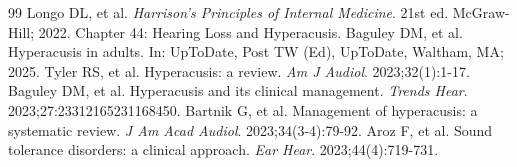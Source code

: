 \begin{thebibliography}{99}
 Longo DL, et al. \emph{Harrison's Principles of Internal Medicine}. 21st ed. McGraw-Hill; 2022. Chapter 44: Hearing Loss and Hyperacusis.
 Baguley DM, et al. Hyperacusis in adults. In: UpToDate, Post TW (Ed), UpToDate, Waltham, MA; 2025.
 Tyler RS, et al. Hyperacusis: a review. \emph{Am J Audiol}. 2023;32(1):1-17.
 Baguley DM, et al. Hyperacusis and its clinical management. \emph{Trends Hear}. 2023;27:23312165231168450.
 Bartnik G, et al. Management of hyperacusis: a systematic review. \emph{J Am Acad Audiol}. 2023;34(3-4):79-92.
 Aroz F, et al. Sound tolerance disorders: a clinical approach. \emph{Ear Hear}. 2023;44(4):719-731.
\end{thebibliography}
